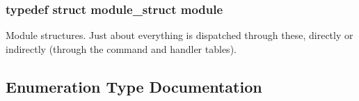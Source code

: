 \subsubsection[{\texorpdfstring{module}{module}}]{\setlength{\rightskip}{0pt plus 5cm}typedef struct {\bf module\+\_\+struct} {\bf module}}\hypertarget{group__APACHE__CORE__CONFIG_ga0ea4f633a5f9f88e1603aaeb1f2b2e69}{}\label{group__APACHE__CORE__CONFIG_ga0ea4f633a5f9f88e1603aaeb1f2b2e69}
Module structures. Just about everything is dispatched through these, directly or indirectly (through the command and handler tables). 

\subsection{Enumeration Type Documentation}
